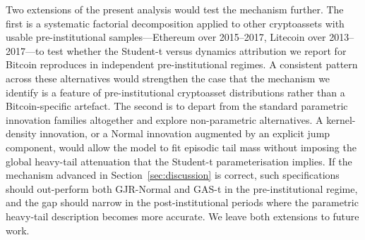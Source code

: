 Two extensions of the present analysis would test the mechanism further. The first is a systematic factorial decomposition applied to other cryptoassets with usable pre-institutional samples---Ethereum over 2015--2017, Litecoin over 2013--2017---to test whether the Student-t versus dynamics attribution we report for Bitcoin reproduces in independent pre-institutional regimes. A consistent pattern across these alternatives would strengthen the case that the mechanism we identify is a feature of pre-institutional cryptoasset distributions rather than a Bitcoin-specific artefact. The second is to depart from the standard parametric innovation families altogether and explore non-parametric alternatives. A kernel-density innovation, or a Normal innovation augmented by an explicit jump component, would allow the model to fit episodic tail mass without imposing the global heavy-tail attenuation that the Student-t parameterisation implies. If the mechanism advanced in Section~\ref{sec:discussion} is correct, such specifications should out-perform both GJR-Normal and GAS-t in the pre-institutional regime, and the gap should narrow in the post-institutional periods where the parametric heavy-tail description becomes more accurate. We leave both extensions to future work.
